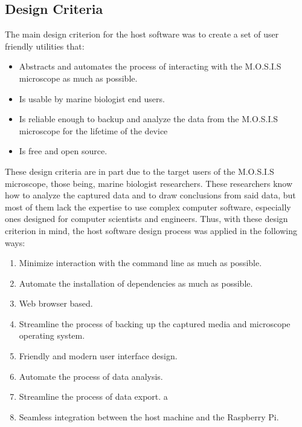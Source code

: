 \documentclass[12pt]{article}
\begin{document}
\subsection{Design Criteria}
The main design criterion for the host software was to create a set of user friendly utilities that:
\begin{itemize}
	\item Abstracts and automates the process of interacting with the M.O.S.I.S microscope as much as possible.
	\item Is usable by marine biologist end users.
	\item Is reliable enough to backup and analyze the data from the M.O.S.I.S microscope for the lifetime of the device
	\item Is free and open source.
\end{itemize}
These design criteria are in part due to the target users of the M.O.S.I.S microscope, those being, marine biologist researchers. These researchers know how to analyze the captured data and to draw conclusions from said data, but most of them lack the expertise to use complex computer software, especially ones designed for computer scientists and engineers. Thus, with these design criterion in mind, the host software design process was applied in the following ways:
\begin{enumerate}
	\item Minimize interaction with the command line as much as possible.
	\item Automate the installation of dependencies as much as possible.
	\item Web browser based.
	\item Streamline the process of backing up the captured media and microscope operating system.
	\item Friendly and modern user interface design.
	\item Automate the process of data analysis.
	\item Streamline the process of data export.
	      a	\item Seamless integration between the host machine and the Raspberry Pi.
\end{enumerate}
\end{document}

